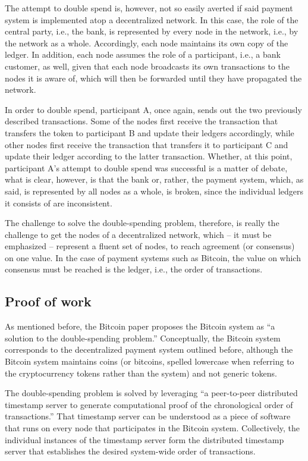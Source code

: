 The attempt to double spend is, however, not so easily averted if said payment system is implemented atop a decentralized network.
In this case, the role of the central party, i.e., the bank, is represented by every node in the network, i.e., by the network as a whole.
Accordingly, each node maintains its own copy of the ledger.
In addition, each node assumes the role of a participant, i.e., a bank customer, as well, given that each node broadcasts its own transactions to the nodes it is aware of, which will then be forwarded until they have propagated the network.

In order to double spend, participant A, once again, sends out the two previously described transactions.
Some of the nodes first receive the transaction that transfers the token to participant B and update their ledgers accordingly, while other nodes first receive the transaction that transfers it to participant C and update their ledger according to the latter transaction.
Whether, at this point, participant A's attempt to double spend was successful is a matter of debate, what is clear, however, is that the bank or, rather, the payment system, which, as said, is represented by all nodes as a whole, is broken, since the individual ledgers it consists of are inconsistent.

The challenge to solve the double-spending problem, therefore, is really the challenge to get the nodes of a decentralized network, which -- it must be emphasized -- represent a fluent set of nodes, to reach agreement (or consensus) on one value.
In the case of payment systems such as Bitcoin, the value on which consensus must be reached is the ledger, i.e., the order of transactions.

\subsection{Proof of work}

As mentioned before, the Bitcoin paper proposes the Bitcoin system as ``a solution to the double-spending problem.'' \autocite[1]{bitcoin2008paper}
Conceptually, the Bitcoin system corresponds to the decentralized payment system outlined before, although the Bitcoin system maintains coins (or bitcoins, spelled lowercase when referring to the cryptocurrency tokens rather than the system) and not generic tokens.

The double-spending problem is solved by leveraging ``a peer-to-peer distributed timestamp server to generate computational proof of the chronological order of transactions.''
That timestamp server can be understood as a piece of software that runs on every node that participates in the Bitcoin system.
Collectively, the individual instances of the timestamp server form the distributed timestamp server that establishes the desired system-wide order of transactions.

